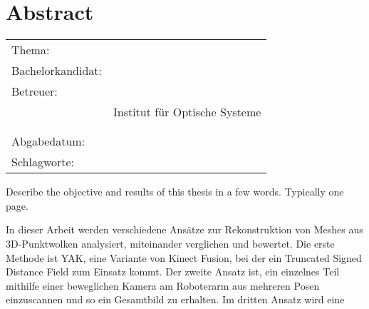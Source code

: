 \thispagestyle{plain}
\chapter*{Abstract}
\label{ch:abstract}


\begin{center}
	\begin{tabular}{p{3.2cm}p{9.6cm}}
		Thema: & \thema \\[1ex]
		Bachelorkandidat: & \autor \\[1ex]
		Betreuer: & \prueferA \\%
		 & Institut für Optische Systeme\\[1ex]
		 & \prueferB \\%
		 & \firma \\[1ex]
		Abgabedatum: & \abgabedatum \\[1ex]
		Schlagworte: & \schlagworte \\
	\end{tabular}
\end{center}


Describe the objective and results of this thesis in a few words.
Typically one page. %

In dieser Arbeit werden verschiedene Ansätze zur Rekonstruktion von Meshes aus 3D-Punktwolken analysiert, miteinander verglichen und bewertet.
Die erste Methode ist YAK, eine Variante von Kinect Fusion, bei der ein Truncated Signed Distance Field zum Einsatz kommt.
Der zweite Ansatz ist, ein einzelnes Teil mithilfe einer beweglichen Kamera am Roboterarm aus mehreren Posen einzuscannen und so ein Gesamtbild zu erhalten.
Im dritten Ansatz wird eine 

\newpage
